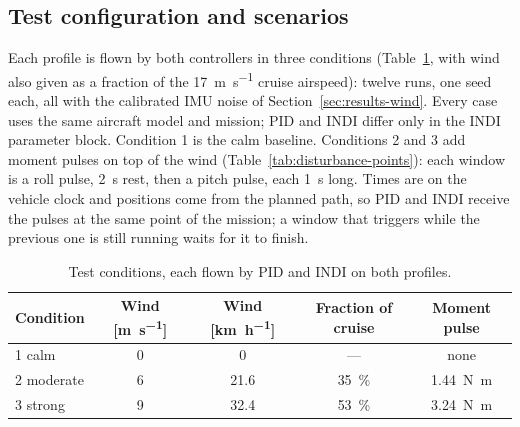 \documentclass{article}
\begin{document}
\subsection{Test configuration and scenarios}
\label{sec:test-scenarios}
Each profile is flown by both controllers in three conditions (Table~\ref{tab:test-matrix}, with wind also given as a fraction of the \SI{17}{\meter\per\second} cruise airspeed): twelve runs, one seed each, all with the calibrated IMU noise of Section~\ref{sec:results-wind}. Every case uses the same aircraft model and mission; PID and INDI differ only in the INDI parameter block. Condition 1 is the calm baseline. Conditions 2 and 3 add moment pulses on top of the wind (Table~\ref{tab:disturbance-points}): each window is a roll pulse, \SI{2}{\second} rest, then a pitch pulse, each \SI{1}{\second} long. Times are on the vehicle clock and positions come from the planned path, so PID and INDI receive the pulses at the same point of the mission; a window that triggers while the previous one is still running waits for it to finish.

\begin{table}[H]
\centering
\caption{Test conditions, each flown by PID and INDI on both profiles.}
\label{tab:test-matrix}
\begin{tabular}{lcccc}
\hline
Condition & Wind [\si{\meter\per\second}] & Wind [\si{\kilo\meter\per\hour}] & Fraction of cruise & Moment pulse \\
\hline
1 calm      & 0 & 0    & ---               & none \\
\hline
2 moderate  & 6 & 21.6 & \SI{35}{\percent} & \SI{1.44}{\newton\meter} \\
\hline
3 strong    & 9 & 32.4 & \SI{53}{\percent} & \SI{3.24}{\newton\meter} \\
\hline
\end{tabular}
\end{table}
\end{document}
